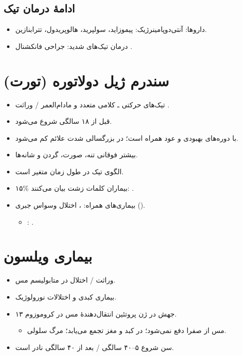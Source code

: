 \documentclass[a4paper,12pt]{extbook}
\begin{document}
\subsection*{ادامهٔ درمان تیک}
\begin{itemize}
\item داروها: آنتی‌دوپامینرژیک: پیموزاید، سولپرید، هالوپریدول، تترا‌بنازین.
\item درمان تیک‌های شدید: جراحی فانکشنال .
\end{itemize}
\section*{سندرم ژیل دولاتوره (تورت)}
\begin{itemize}
\item تیک‌های حرکتی ـ کلامی متعدد و مادام‌العمر / وراثت .
\item قبل از ۱۸ سالگی شروع می‌شود.
\item با دوره‌های بهبودی و عود همراه است؛ در بزرگسالی شدت علائم کم می‌شود.
\item بیشتر فوقانی تنه، صورت، گردن و شانه‌ها.
\item الگوی تیک در طول زمان متغیر است.
\item ۱۵\% بیماران کلمات زشت بیان می‌کنند: .
\item بیماری‌های همراه: ، اختلال وسواس جبری ().
\begin{itemize}
\item {}: .
\end{itemize}
\end{itemize}
\section*{بیماری ویلسون}
\begin{itemize}
\item وراثت  / اختلال در متابولیسم مس.
\item بیماری کبدی و اختلالات نورولوژیک.
\item جهش در ژن پروتئین انتقال‌دهندهٔ مس در کروموزوم ۱۳.
\begin{itemize}
\item مس از صفرا دفع نمی‌شود؛ در کبد و مغز تجمع می‌یابد؛ مرگ سلولی.
\end{itemize}
\item سن شروع ۵–۴۰ سالگی / بعد از ۴۰ سالگی نادر است.
\end{itemize}
\end{document}
